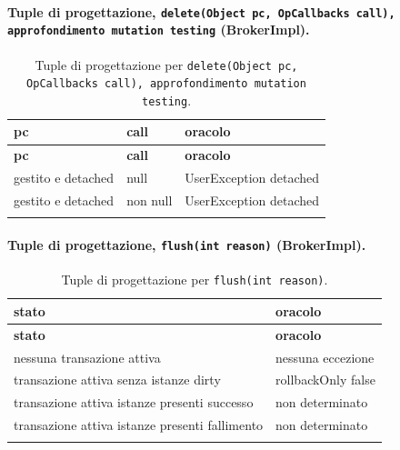 \paragraph*{Tuple di progettazione, \texttt{delete(Object pc, OpCallbacks call), approfondimento mutation testing} (BrokerImpl).}

{\footnotesize\setlength{\tabcolsep}{3pt}
\begin{longtable}{>{\raggedright\arraybackslash}p{}>{\raggedright\arraybackslash}p{}>{\raggedright\arraybackslash}p{}}
\toprule
\textbf{pc} & \textbf{call} & \textbf{oracolo} \\
\midrule
\endfirsthead
\toprule
\textbf{pc} & \textbf{call} & \textbf{oracolo} \\
\midrule
\endhead
\bottomrule
\endfoot
gestito e detached & null & UserException detached \\
gestito e detached & non null & UserException detached \\
\bottomrule
\caption{Tuple di progettazione per \texttt{delete(Object pc, OpCallbacks call), approfondimento mutation testing}.}
\label{tab:delete2-tuple}
\end{longtable}
}



\paragraph*{Tuple di progettazione, \texttt{flush(int reason)} (BrokerImpl).}

{\footnotesize\setlength{\tabcolsep}{3pt}
\begin{longtable}{>{\raggedright\arraybackslash}p{}>{\raggedright\arraybackslash}p{}}
\toprule
\textbf{stato} & \textbf{oracolo} \\
\midrule
\endfirsthead
\toprule
\textbf{stato} & \textbf{oracolo} \\
\midrule
\endhead
\bottomrule
\endfoot
nessuna transazione attiva & nessuna eccezione \\
transazione attiva senza istanze dirty & rollbackOnly false \\
transazione attiva istanze presenti successo & non determinato \\
transazione attiva istanze presenti fallimento & non determinato \\
\bottomrule
\caption{Tuple di progettazione per \texttt{flush(int reason)}.}
\label{tab:flush-tuple}
\end{longtable}
}




